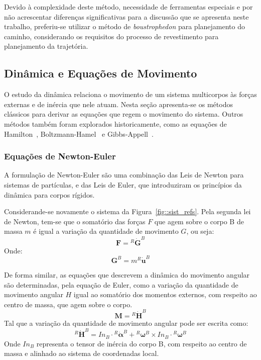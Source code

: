 Devido à complexidade deste método, necessidade de ferramentas especiais e por
não acrescentar diferenças significativas para a discussão que se apresenta
neste trabalho, preferiu-se utilizar o método de \textit{boustrophedon} para
planejamento do caminho, considerando os requisitos do processo de revestimento
para planejamento da trajetória.



\subsection{Dinâmica e Equações de Movimento}

O estudo da dinâmica relaciona o movimento de um sistema multicorpos às forças
externas e de inércia que nele atuam. Nesta seção apresenta-se os métodos
clássicos para derivar as equações que regem o movimento do sistema. Outros
métodos também foram explorados historicamente, como as equações de
Hamilton~\cite{shabana2013dynamics},
Boltzmann-Hamel~\cite{papastavridis1994boltzmann} e
Gibbs-Appell~\cite{gibbsappell}.
 
\subsubsection{Equações de Newton-Euler}

A formulação de Newton-Euler são uma combinação das Leis de Newton para sistemas
de partículas, e das Leis de Euler, que introduziram os princípios da dinâmica
para corpos rígidos. 

Considerande-se novamente o sistema da Figura~\ref{fig::sist_refs}. Pela segunda
lei de Newton, tem-se que o somatório das forças $F$ que agem sobre o corpo B de
massa $m$ é igual a variação da quantidade de movimento $G$, ou seja:
%
\begin{equation} \label{eq::newton}
	\mathbf{F} = {^R}{\dot{\mathbf{G}}}^{B}
\end{equation}
%
Onde:
%
\begin{equation}
	\mathbf{G}^{B} = m {^R}\dot{\textbf{u}}^{B}
\end{equation}
%


De forma similar, as equações que descrevem a dinâmica do movimento angular são
determinadas, pela equação de Euler, como a variação da quantidade de movimento
angular $H$ igual ao somatório dos momentos externos, com respeito
ao centro de massa, que agem sobre o corpo.
%
\begin{equation} \label{eq::euler}
	\mathbf{M} = {^R}{\dot{\mathbf{H}}}^{B}
\end{equation}
%
Tal que a variação da quantidade de movimento angular pode ser escrita como:
%
\begin{equation}
	{^R}{\dot{\mathbf{H}}}^{B} = In_B \cdot {^R}\dot{\boldsymbol{\alpha}}^{B} +
	{^R}\boldsymbol{\omega}^{B} \times In_B \cdot {^R}\boldsymbol{\omega}^{B}
\end{equation}
%
Onde $In_B$ representa o tensor de inércia do corpo B, com respeito ao centro de
massa e alinhado ao sistema de coordenadas local.

